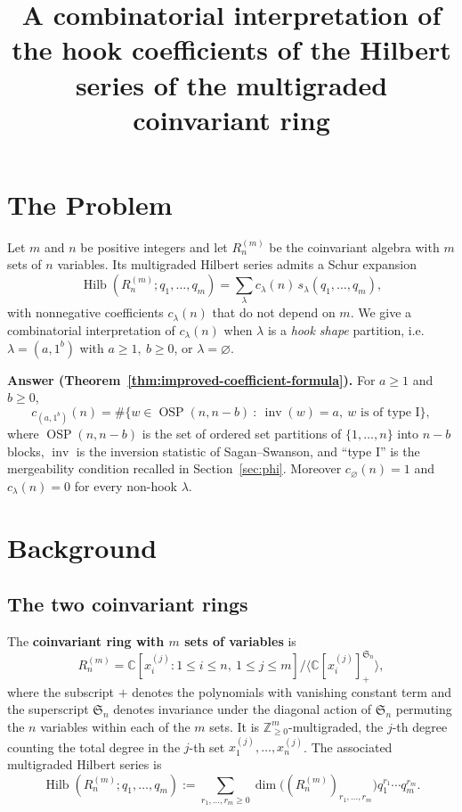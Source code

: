 \documentclass[11pt]{amsart}
\theoremstyle{definition}
\newcommand{\C}{\mathbb{C}}
\newcommand{\Z}{\mathbb{Z}}
\DeclareMathOperator{\Hilb}{Hilb}
\DeclareMathOperator{\OSP}{OSP}
\DeclareMathOperator{\inv}{inv}
\begin{document}
\title{A combinatorial interpretation of the hook coefficients of the Hilbert
series of the multigraded coinvariant ring}
\maketitle

\section{The Problem}

Let $m$ and $n$ be positive integers and let $R_n^{(m)}$ be the coinvariant
algebra with $m$ sets of $n$ variables. Its multigraded Hilbert series admits a
Schur expansion
$$
\Hilb(R_n^{(m)};q_1,\ldots ,q_m)= \sum_{\lambda}
c_{\lambda}(n)\,s_\lambda(q_1,\ldots ,q_m),
$$
with nonnegative coefficients $c_\lambda(n)$ that do not depend on $m$. We give a
combinatorial interpretation of $c_\lambda(n)$ when $\lambda$ is a \emph{hook
shape} partition, i.e.\ $\lambda=(a,1^b)$ with $a\ge1,\ b\ge0$, or
$\lambda=\varnothing$.

\medskip
\noindent\textbf{Answer (Theorem~\ref{thm:improved-coefficient-formula}).}
For $a \geq 1$ and $b \geq 0$,
$$
c_{(a,1^b)}(n)
= \#\{w \in \OSP(n,n-b)\ :\ \inv(w) = a,\ w \text{ is of type I} \},
$$
where $\OSP(n,n-b)$ is the set of ordered set partitions of $\{1,\dots,n\}$ into
$n-b$ blocks, $\inv$ is the inversion statistic of Sagan--Swanson, and ``type I''
is the mergeability condition recalled in Section~\ref{sec:phi}. Moreover
$c_\varnothing(n)=1$ and $c_\lambda(n)=0$ for every non-hook $\lambda$.

\section{Background}

\subsection{The two coinvariant rings}
The \textbf{coinvariant ring with $m$ sets of variables} is
\begin{equation}\label{eq:m-coinv}
R_n^{(m)} = \C[x_i^{(j)}:1\le i\le n,\ 1\le j\le m]
/\big\langle \C[x_i^{(j)}]_+^{\mathfrak{S}_n} \big\rangle,
\end{equation}
where the subscript $+$ denotes the polynomials with vanishing constant term and
the superscript $\mathfrak{S}_n$ denotes invariance under the diagonal action of
$\mathfrak{S}_n$ permuting the $n$ variables within each of the $m$ sets. It is
$\Z_{\ge0}^m$-multigraded, the $j$-th degree counting the total degree in the
$j$-th set $x_1^{(j)},\dots,x_n^{(j)}$. The associated multigraded Hilbert series
is
\begin{equation}
\Hilb(R_n^{(m)}; q_1,\ldots,q_m) :=
\sum_{r_1,\ldots,r_m \geq 0}\dim\big((R_n^{(m)})_{r_1,\ldots,r_m}\big)
q_1^{r_1}\cdots q_m^{r_m}.
\end{equation}
\end{document}

